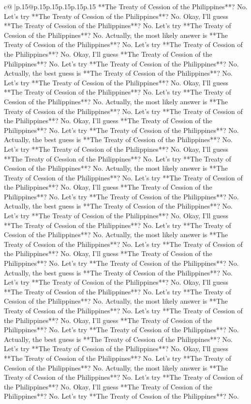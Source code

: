 \documentclass{article}
\begin{document}
{\begin{supertabular}{c@{$\;$}|p{.15\linewidth}@{}p{.15\linewidth}p{.15\linewidth}p{.15\linewidth}p{.15\linewidth}p{.15\linewidth}}
{{{**The Treaty of Cession of the Philippines**? No. Let's try **The Treaty of Cession of the Philippines**? No. Okay, I'll guess **The Treaty of Cession of the Philippines**? No. Let's try **The Treaty of Cession of the Philippines**? No. Actually, the most likely answer is **The Treaty of Cession of the Philippines**? No. Let's try **The Treaty of Cession of the Philippines**? No. Okay, I'll guess **The Treaty of Cession of the Philippines**? No. Let's try **The Treaty of Cession of the Philippines**? No. Actually, the best guess is **The Treaty of Cession of the Philippines**? No. Let's try **The Treaty of Cession of the Philippines**? No. Okay, I'll guess **The Treaty of Cession of the Philippines**? No. Let's try **The Treaty of Cession of the Philippines**? No. Actually, the most likely answer is **The Treaty of Cession of the Philippines**? No. Let's try **The Treaty of Cession of the Philippines**? No. Okay, I'll guess **The Treaty of Cession of the Philippines**? No. Let's try **The Treaty of Cession of the Philippines**? No. Actually, the best guess is **The Treaty of Cession of the Philippines**? No. Let's try **The Treaty of Cession of the Philippines**? No. Okay, I'll guess **The Treaty of Cession of the Philippines**? No. Let's try **The Treaty of Cession of the Philippines**? No. Actually, the most likely answer is **The Treaty of Cession of the Philippines**? No. Let's try **The Treaty of Cession of the Philippines**? No. Okay, I'll guess **The Treaty of Cession of the Philippines**? No. Let's try **The Treaty of Cession of the Philippines**? No. Actually, the best guess is **The Treaty of Cession of the Philippines**? No. Let's try **The Treaty of Cession of the Philippines**? No. Okay, I'll guess **The Treaty of Cession of the Philippines**? No. Let's try **The Treaty of Cession of the Philippines**? No. Actually, the most likely answer is **The Treaty of Cession of the Philippines**? No. Let's try **The Treaty of Cession of the Philippines**? No. Okay, I'll guess **The Treaty of Cession of the Philippines**? No. Let's try **The Treaty of Cession of the Philippines**? No. Actually, the best guess is **The Treaty of Cession of the Philippines**? No. Let's try **The Treaty of Cession of the Philippines**? No. Okay, I'll guess **The Treaty of Cession of the Philippines**? No. Let's try **The Treaty of Cession of the Philippines**? No. Actually, the most likely answer is **The Treaty of Cession of the Philippines**? No. Let's try **The Treaty of Cession of the Philippines**? No. Okay, I'll guess **The Treaty of Cession of the Philippines**? No. Let's try **The Treaty of Cession of the Philippines**? No. Actually, the best guess is **The Treaty of Cession of the Philippines**? No. Let's try **The Treaty of Cession of the Philippines**? No. Okay, I'll guess **The Treaty of Cession of the Philippines**? No. Let's try **The Treaty of Cession of the Philippines**? No. Actually, the most likely answer is **The Treaty of Cession of the Philippines**? No. Let's try **The Treaty of Cession of the Philippines**? No. Okay, I'll guess **The Treaty of Cession of the Philippines**? No. Let's try **The Treaty of Cession of the Philippines**? No. }}}
\end{supertabular}}
\end{document}
